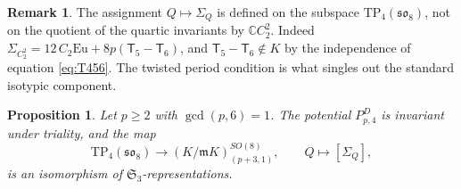 \documentclass[10pt,reqno]{amsart}
\numberwithin{equation}{section}
\theoremstyle{plain}
\newtheorem{proposition}[theorem]{Proposition}
\theoremstyle{definition}
\newtheorem{remark}[theorem]{Remark}
\newcommand{\Sym}{\mathfrak{S}}
\newcommand{\Eu}{\mathrm{Eu}}
\newcommand{\TP}{\mathrm{TP}}
\newcommand{\sT}{\mathsf{T}}
\begin{document}
\begin{remark}\label{rem:not-quotient}
The assignment $Q\mapsto\Sigma_Q$ is defined on the subspace $\TP_4(\mathfrak{so}_8)$, not on the quotient of the quartic invariants by $\mathbb{C} C_2^2$. Indeed $\Sigma_{C_2^2}=12\,C_2\Eu+8p(\sT_5-\sT_6)$, and $\sT_5-\sT_6\notin K$ by the independence of equation \eqref{eq:T456}. The twisted period condition is what singles out the standard isotypic component.
\end{remark}

\begin{proposition}\label{prop:triality}
Let $p\ge2$ with $\gcd(p,6)=1$. The potential $P^D_{p,4}$ is invariant under triality, and the map
\begin{equation}\label{eq:triality-map}
	\TP_4(\mathfrak{so}_8)\longrightarrow(K/\mathfrak{m} K)^{SO(8)}_{(p+3,1)},\qquad Q\longmapsto[\Sigma_Q],
\end{equation}
is an isomorphism of $\Sym_3$-representations.
\end{proposition}
\end{document}
